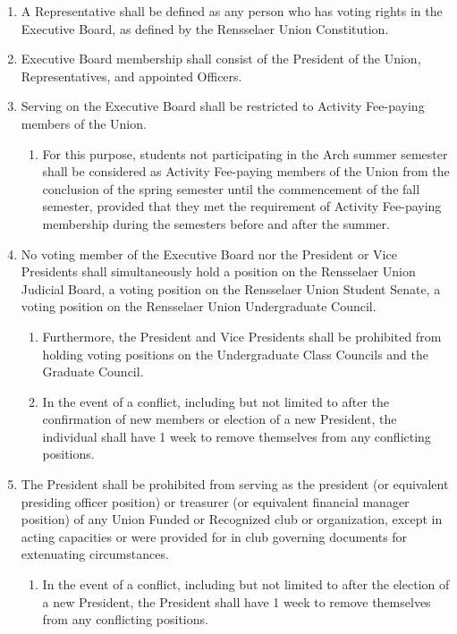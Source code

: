 \begin{enumerate}
\item A Representative shall be defined as any person who has voting rights in the Executive Board, as defined by the Rensselaer Union Constitution.
\item Executive Board membership shall consist of the President of the Union, Representatives, and appointed Officers.
\item Serving on the Executive Board shall be restricted to Activity Fee-paying members of the Union.
  \begin{enumerate}
  \item For this purpose, students not participating in the Arch summer semester shall be considered as Activity Fee-paying members of the Union from the conclusion of the spring semester until the commencement of the fall semester, provided that they met the requirement of Activity Fee-paying membership during the semesters before and after the summer.
  \end{enumerate}
\item No voting member of the Executive Board nor the President or Vice Presidents shall simultaneously hold a position on the Rensselaer Union Judicial Board, a voting position on the Rensselaer Union Student Senate, a voting position on the Rensselaer Union Undergraduate Council.
  \begin{enumerate}
  \item Furthermore, the President and Vice Presidents shall be prohibited from holding voting positions on the Undergraduate Class Councils and the Graduate Council.
  \item In the event of a conflict, including but not limited to after the confirmation of new members or election of a new President, the individual shall have 1 week to remove themselves from any conflicting positions.
  \end{enumerate}
\item The President shall be prohibited from serving as the president (or equivalent presiding officer position) or treasurer (or equivalent financial manager position) of any Union Funded or Recognized club or organization, except in acting capacities or were provided for in club governing documents for extenuating circumstances.
  \begin{enumerate}
  \item In the event of a conflict, including but not limited to after the election of a new President, the President shall have 1 week to remove themselves from any conflicting positions.
  \end{enumerate}
\end{enumerate}

